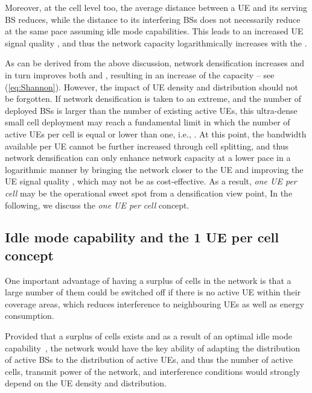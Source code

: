 \documentclass{IEEEtran}
\begin{document}
Moreover, at the cell level too,
the average distance between a \ac{UE} and its serving \ac{BS} reduces,
while the distance to its interfering \acp{BS} does not necessarily reduce at the same pace assuming idle mode capabilities.
This leads to an increased UE signal quality ,
and thus the network capacity logarithmically increases with the .


As can be derived from the above discussion,
network densification increases  and in turn improves both  and ,
resulting in an increase of the capacity
-- see (\ref{eq:Shannon}).
However, the impact of \ac{UE} density and distribution should not be forgotten.
If network densification is taken to an extreme,
and the number of deployed \acp{BS} is larger than the number of existing active \acp{UE},
this ultra-dense small cell deployment may reach a fundamental limit
in which the number of active \acp{UE} per cell is equal or lower than one, i.e., .
At this point,
the bandwidth  available per \ac{UE} cannot be further increased through cell splitting,
and thus network densification can only enhance network capacity  at a lower pace in a logarithmic manner
by bringing the network closer to the \ac{UE} and improving the \ac{UE} signal quality ,
which may not be as cost-effective.
As a result,
\emph{one \ac{UE} per cell} may be the operational sweet spot from a densification view point,
In the following, we discuss the \emph{one \ac{UE} per cell} concept.

\subsection{Idle mode capability and the 1 UE per cell concept}

One important advantage of having a surplus of cells in the network is that a large number of them could be switched off if there is no active \ac{UE} within their coverage areas,
which reduces interference to neighbouring \acp{UE} as well as energy consumption.

Provided that a surplus of cells exists and as a result of an optimal idle mode capability~\cite{Ashraf:10a},
the network would have the key ability of adapting the distribution of active \acp{BS} to the distribution of active \acp{UE},
and thus the number of active cells, transmit power of the network, and interference conditions
would strongly depend on the \ac{UE} density and distribution.
\end{document}
